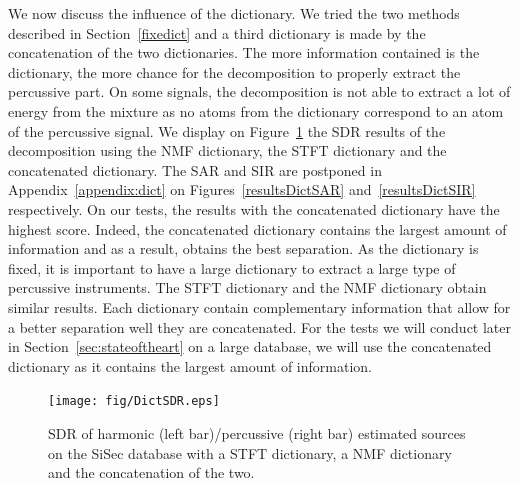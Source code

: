 We now discuss the influence of the dictionary. We tried the two methods described in Section~\ref{fixedict} and a third dictionary is made by the concatenation of the two dictionaries. The more information contained is the dictionary, the more chance for the decomposition to properly extract the percussive part. On some signals, the decomposition is not able to extract a lot of energy from the mixture as no atoms from the dictionary correspond to an atom of the percussive signal.
We display on Figure~\ref{resultsDict} the SDR results of the decomposition using the NMF dictionary, the STFT dictionary and the concatenated dictionary. The SAR and SIR are postponed in Appendix~\ref{appendix:dict} on Figures~\ref{resultsDictSAR} and~\ref{resultsDictSIR} respectively. On our tests, the results with the concatenated dictionary have the highest score. Indeed, the concatenated dictionary contains the largest amount of information and as a result, obtains the best separation. As the dictionary is fixed, it is important to have a large dictionary to extract a large type of percussive instruments. The STFT dictionary and the NMF dictionary obtain similar results. Each dictionary contain complementary information that allow for a better separation well they are concatenated. For the tests we will conduct later in Section~\ref{sec:stateoftheart} on a large database, we will use the concatenated dictionary as it contains the largest amount of information. 


\begin{figure}[htb]

  \centering 
  \texttt{[image: fig/DictSDR.eps]}
  \caption{\label{resultsDict} SDR of harmonic (left bar)/percussive (right bar) estimated sources on the SiSec database with a STFT dictionary, a NMF dictionary and the concatenation of the two.}
  
\end{figure}


%   
%
%
%
